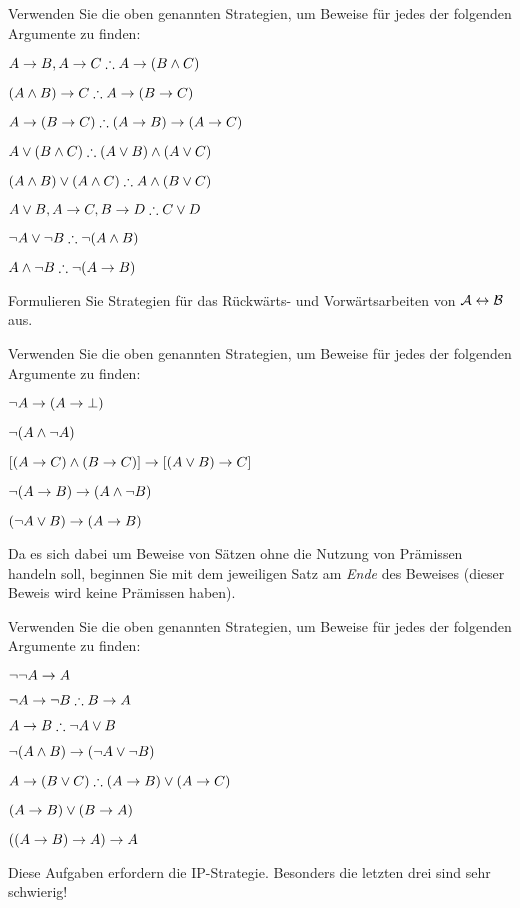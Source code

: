 \practiceproblems

\problempart
Verwenden Sie die oben genannten Strategien, um Beweise für jedes der folgenden Argumente zu finden:
\begin{earg}
\item $A \eif B, A \eif C \therefore A \eif (B \eand C)$
\item $(A \eand B) \eif C \therefore A \eif (B \eif C)$
\item $A \eif (B \eif C) \therefore (A \eif B) \eif (A \eif C)$
\item $A \eor (B \eand C) \therefore (A \eor B) \eand (A \eor C)$
\item $(A \eand B) \eor (A \eand C) \therefore A \eand (B \eor C)$
\item $A \eor B, A \eif C, B \eif D \therefore C \eor D$
\item $\enot A \lor \enot B \therefore \enot(A \eand B)$
\item $A \eand \enot B \therefore \enot(A \eif B)$
\end{earg}

\problempart
Formulieren Sie Strategien für das Rückwärts- und Vorwärtsarbeiten von $\mathcal{A} \leftrightarrow \mathcal{B}$ aus.


\problempart
Verwenden Sie die oben genannten Strategien, um Beweise für jedes der folgenden Argumente zu finden:
\begin{earg}
\item $\neg A \rightarrow (A \rightarrow \bot)$
\item $\neg(A \wedge \neg A)$
\item $[(A \rightarrow C) \wedge (B \rightarrow C)] \rightarrow [(A \lor B) \rightarrow C]$
\item $\neg(A \rightarrow B) \rightarrow (A \wedge \neg B)$
\item $(\neg A \vee B) \rightarrow (A \rightarrow B)$
\end{earg}
Da es sich dabei um Beweise von Sätzen ohne die Nutzung von Prämissen handeln soll, beginnen Sie mit dem jeweiligen Satz am \emph{Ende} des Beweises (dieser Beweis wird keine Prämissen haben).

\problempart
Verwenden Sie die oben genannten Strategien, um Beweise für jedes der folgenden Argumente zu finden:
\begin{earg}
\item $\neg\neg A \rightarrow A$
\item $\enot A \eif \enot B \therefore B \eif A$
\item $A \eif B \therefore \enot A \eor B$
\item $\neg(A \wedge B) \rightarrow (\neg A \vee \neg B)$
\item $A \eif (B \eor C) \therefore (A \eif B) \eor (A \eif C)$
\item $(A \rightarrow B) \lor (B \rightarrow A)$
\item $((A \rightarrow B) \rightarrow A) \rightarrow A$
\end{earg}
Diese Aufgaben erfordern die IP-Strategie. Besonders die letzten drei sind sehr schwierig!

